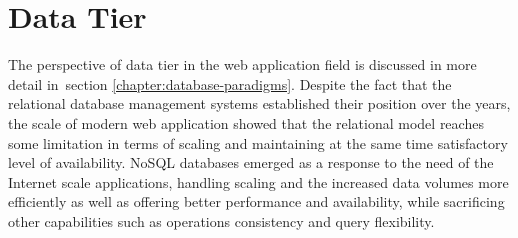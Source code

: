 
\section{Data Tier} \label{chapter:serverless-datastores}

The perspective of data tier in the web application field is discussed in more detail in~section \ref{chapter:database-paradigms}.
Despite the fact that the relational database management systems established their position over the years, the scale of modern web application showed that the relational model reaches some limitation in terms of scaling and maintaining at the same time satisfactory level of availability.
NoSQL databases emerged as a response to the need of the Internet scale applications, handling scaling and the increased data volumes more efficiently as well as offering better performance and availability, while sacrificing other capabilities such as operations consistency and query flexibility.

